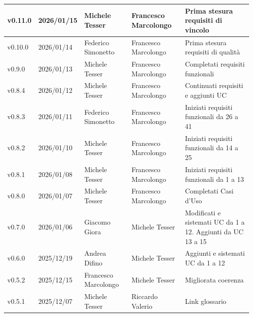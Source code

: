 ﻿\documentclass[a4paper,12pt]{article}
\begin{document}
\begin{center}
\begin{tabularx}{\textwidth}{|l|l|l|X|X|}
        \hline
        v0.11.0            & 2026/01/15          & Michele Tesser       & Francesco Marcolongo  & Prima stesura requisiti di vincolo                          \\
        \hline
        v0.10.0            & 2026/01/14          & Federico Simonetto   & Francesco Marcolongo  & Prima stesura requisiti di qualità                          \\
        \hline
        v0.9.0             & 2026/01/13          & Michele Tesser       & Francesco Marcolongo  & Completati requisiti funzionali                             \\
        \hline
        v0.8.4             & 2026/01/12          & Michele Tesser       & Francesco Marcolongo  & Continuati requisiti e aggiunti UC                          \\
        \hline
        v0.8.3             & 2026/01/11          & Federico Simonetto   & Francesco Marcolongo  & Iniziati requisiti funzionali da 26 a 41                    \\
        \hline
        v0.8.2             & 2026/01/10          & Michele Tesser       & Francesco Marcolongo  & Iniziati requisiti funzionali da 14 a 25                    \\
        \hline
        v0.8.1             & 2026/01/08          & Michele Tesser       & Francesco Marcolongo  & Iniziati requisiti funzionali da 1 a 13                     \\
        \hline
        v0.8.0             & 2026/01/07          & Michele Tesser       & Francesco Marcolongo  & Completati Casi d'Uso                                       \\
        \hline
        v0.7.0             & 2026/01/06          & Giacomo Giora        & Michele Tesser        & Modificati e sistemati UC da 1 a 12. Aggiunti da UC 13 a 15 \\
        \hline
        v0.6.0             & 2025/12/19          & Andrea Difino        & Michele Tesser        & Aggiunti e sistemati UC da 1 a 12                           \\
        \hline
        v0.5.2             & 2025/12/15          & Francesco Marcolongo & Michele Tesser        & Migliorata coerenza                                         \\
        \hline
        v0.5.1             & 2025/12/07          & Michele Tesser       & Riccardo Valerio      & Link glossario                                              \\
        \hline

\end{tabularx}
\end{center}
\end{document}
